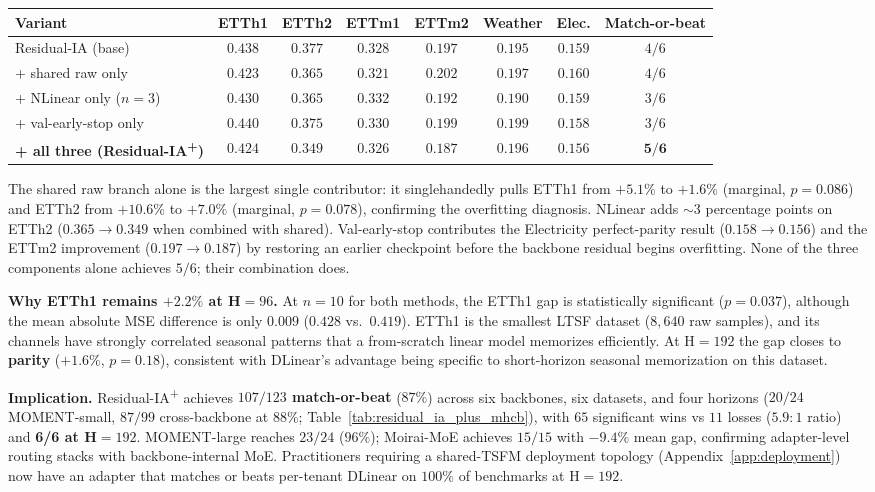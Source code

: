 \documentclass{article}
\begin{document}
\begin{center}
\small
\begin{tabular}{@{}lcccccc|c@{}}
\toprule
Variant & ETTh1 & ETTh2 & ETTm1 & ETTm2 & Weather & Elec. & Match-or-beat \\
\midrule
Residual-IA (base)                     & $0.438$ & $0.377$ & $0.328$ & $0.197$ & $0.195$ & $0.159$ & $4/6$ \\
+ shared raw only                      & $0.423$ & $0.365$ & $0.321$ & $0.202$ & $0.197$ & $0.160$ & $4/6$ \\
+ NLinear only ($n{=}3$)               & $0.430$ & $0.365$ & $0.332$ & $0.192$ & $0.190$ & $0.159$ & $3/6$ \\
+ val-early-stop only                  & $0.440$ & $0.375$ & $0.330$ & $0.199$ & $0.199$ & $0.158$ & $3/6$ \\
\textbf{+ all three (Residual-IA\textsuperscript{+})}  & $\mathbf{0.424}$ & $\mathbf{0.349}$ & $\mathbf{0.326}$ & $\mathbf{0.187}$ & $\mathbf{0.196}$ & $\mathbf{0.156}$ & $\mathbf{5/6}$ \\
\bottomrule
\end{tabular}
\end{center}

The shared raw branch alone is the largest single contributor: it singlehandedly pulls ETTh1 from $+5.1\%$ to $+1.6\%$ (marginal, $p{=}0.086$) and ETTh2 from $+10.6\%$ to $+7.0\%$ (marginal, $p{=}0.078$), confirming the overfitting diagnosis. NLinear adds $\sim 3$ percentage points on ETTh2 ($0.365 \to 0.349$ when combined with shared). Val-early-stop contributes the Electricity perfect-parity result ($0.158 \to 0.156$) and the ETTm2 improvement ($0.197 \to 0.187$) by restoring an earlier checkpoint before the backbone residual begins overfitting. None of the three components alone achieves $5/6$; their combination does.

\textbf{Why ETTh1 remains $+2.2\%$ at H${=}96$.} At $n{=}10$ for both methods, the ETTh1 gap is statistically significant ($p{=}0.037$), although the mean absolute MSE difference is only $0.009$ ($0.428$ vs.\ $0.419$). ETTh1 is the smallest LTSF dataset ($8{,}640$ raw samples), and its channels have strongly correlated seasonal patterns that a from-scratch linear model memorizes efficiently. At H${=}192$ the gap closes to \textbf{parity} ($+1.6\%$, $p{=}0.18$), consistent with DLinear's advantage being specific to short-horizon seasonal memorization on this dataset.

\textbf{Implication.} Residual-IA\textsuperscript{+} achieves \textbf{$107/123$ match-or-beat} ($87\%$) across six backbones, six datasets, and four horizons ($20/24$ MOMENT-small, $87/99$ cross-backbone at $88\%$; Table~\ref{tab:residual_ia_plus_mhcb}), with $65$ significant wins vs $11$ losses ($5.9{:}1$ ratio) and \textbf{6/6 at H${=}192$}. MOMENT-large reaches $23/24$ ($96\%$); Moirai-MoE achieves $15/15$ with $-9.4\%$ mean gap, confirming adapter-level routing stacks with backbone-internal MoE. Practitioners requiring a shared-TSFM deployment topology (Appendix~\ref{app:deployment}) now have an adapter that matches or beats per-tenant DLinear on $100\%$ of benchmarks at H${=}192$.
\end{document}
